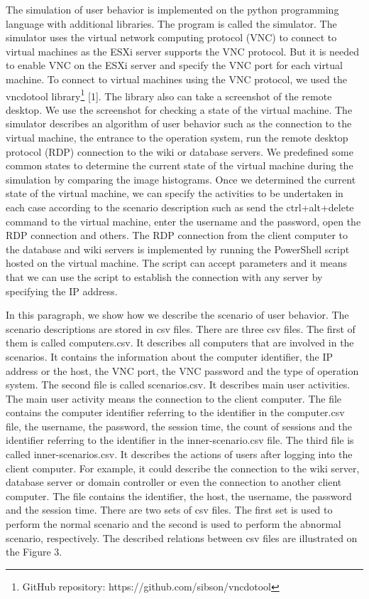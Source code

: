 The simulation of user behavior is implemented on the python programming language with additional libraries. The program is called the simulator. The simulator uses the virtual network computing protocol (VNC) to connect to virtual machines as the ESXi server supports the VNC protocol. But it is needed to enable VNC on the ESXi server and specify the VNC port for each virtual machine. To connect to virtual machines using the VNC protocol, we used the vncdotool library\footnote{GitHub repository: https://github.com/sibson/vncdotool} [1]. The library also can take a screenshot of the remote desktop. We use the screenshot for checking a state of the virtual machine. The simulator describes an algorithm of user behavior such as the connection to the virtual machine, the entrance to the operation system, run the remote desktop protocol (RDP) connection to the wiki or database servers. We predefined some common states to determine the current state of the virtual machine during the simulation by comparing the image histograms. Once we determined the current state of the virtual machine, we can specify the activities to be undertaken in each case according to the scenario description such as send the ctrl+alt+delete command to the virtual machine, enter the username and the password, open the RDP connection and others. The RDP connection from the client computer to the database and wiki servers is implemented by running the PowerShell script hosted on the virtual machine. The script can accept parameters and it means that we can use the script to establish the connection with any server by specifying the IP address.

In this paragraph, we show how we describe the scenario of user behavior. The scenario descriptions are stored in csv files. There are three csv files. The first of them is called computers.csv. It describes all computers that are involved in the scenarios. It contains the information about the computer identifier, the IP address or the host, the VNC port, the VNC password and the type of operation system.
The second file is called scenarios.csv. It describes main user activities. The main user activity means the connection to the client computer. The file contains the computer identifier referring to the identifier in the computer.csv file, the username, the password, the session time, the count of sessions and the identifier referring to the identifier in the inner-scenario.csv file. The third file is called inner-scenarios.csv. It describes the actions of users after logging into the client computer. For example, it could describe the connection to the wiki server, database server or domain controller or even the connection to another client computer. The file contains the identifier, the host, the username, the password and the session time. There are two sets of csv files. The first set is used to perform the normal scenario and the second is used to perform the abnormal scenario, respectively. The described relations between csv files are illustrated on the Figure 3.
 	

